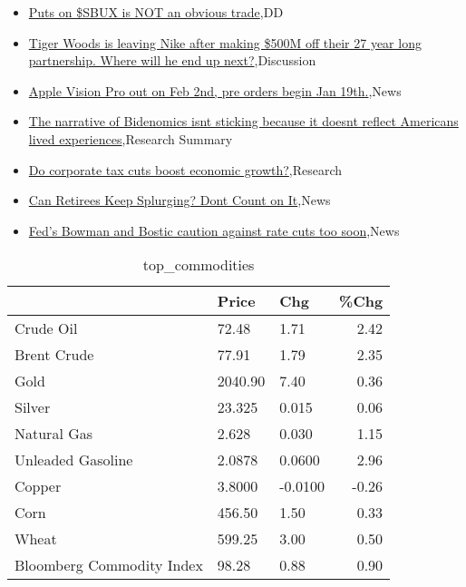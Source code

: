 \documentclass{article}%
\begin{document}
%
\begin{itemize}%
\item%
\href{https://reddit.com/r/wallstreetbets/comments/1929si3/puts\_on\_sbux\_is\_not\_an\_obvious\_trade/}{Puts on \$SBUX is NOT an obvious trade},DD%
\item%
\href{https://reddit.com/r/wallstreetbets/comments/19270h0/tiger\_woods\_is\_leaving\_nike\_after\_making\_500m\_off/}{Tiger Woods is leaving Nike after making \$500M off their 27 year long partnership. Where will he end up next?},Discussion%
\item%
\href{https://reddit.com/r/StockMarket/comments/191nf77/apple\_vision\_pro\_out\_on\_feb\_2nd\_pre\_orders\_begin/}{Apple Vision Pro out on Feb 2nd, pre orders begin Jan 19th.},News%
\item%
\href{https://reddit.com/r/Economics/comments/1926uad/the\_narrative\_of\_bidenomics\_isnt\_sticking\_because/}{The narrative of Bidenomics isnt sticking because it doesnt reflect Americans lived experiences},Research Summary%
\item%
\href{https://reddit.com/r/Economics/comments/191zvaq/do\_corporate\_tax\_cuts\_boost\_economic\_growth/}{Do corporate tax cuts boost economic growth?},Research%
\item%
\href{https://reddit.com/r/Economics/comments/191z3kb/can\_retirees\_keep\_splurging\_dont\_count\_on\_it/}{Can Retirees Keep Splurging? Dont Count on It},News%
\item%
\href{https://reddit.com/r/Economics/comments/191y1dj/feds\_bowman\_and\_bostic\_caution\_against\_rate\_cuts/}{Fed's Bowman and Bostic caution against rate cuts too soon},News%
\end{itemize}%


\begin{table}[htbp]%
\caption{top\_commodities}%
\centering%
\begin{adjustbox}{width=1\textwidth}%
\begin{tabular}{lllr}
\toprule
                          &   Price &     Chg &  \%Chg \\
\midrule
               Crude Oil  &   72.48 &    1.71 &  2.42 \\
             Brent Crude  &   77.91 &    1.79 &  2.35 \\
                    Gold  & 2040.90 &    7.40 &  0.36 \\
                  Silver  &  23.325 &   0.015 &  0.06 \\
             Natural Gas  &   2.628 &   0.030 &  1.15 \\
       Unleaded Gasoline  &  2.0878 &  0.0600 &  2.96 \\
                  Copper  &  3.8000 & -0.0100 & -0.26 \\
                    Corn  &  456.50 &    1.50 &  0.33 \\
                   Wheat  &  599.25 &    3.00 &  0.50 \\
Bloomberg Commodity Index &   98.28 &    0.88 &  0.90 \\
\bottomrule
\end{tabular}
%
\end{adjustbox}%
\end{table}
\end{document}
